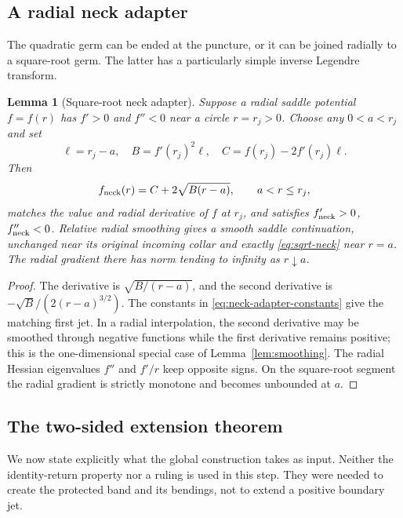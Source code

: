 \documentclass[11pt]{amsart}
\newtheorem{lemma}[theorem]{Lemma}
\theoremstyle{definition}
\theoremstyle{remark}
\numberwithin{equation}{section}
\begin{document}
\subsection{A radial neck adapter}
The quadratic germ can be ended at the puncture, or it can be joined
radially to a square-root germ. The latter has a particularly simple
inverse Legendre transform.

\begin{lemma}[Square-root neck adapter]\label{lem:neck-adapter}
Suppose a radial saddle potential $f=f(r)$ has $f'>0$ and $f''<0$
near a circle $r=r_j>0$. Choose any $0<a<r_j$ and set
\begin{equation}\label{eq:neck-adapter-constants}
 \ell=r_j-a,\quad B=f'(r_j)^2\ell,\quad
 C=f(r_j)-2f'(r_j)\ell.
\end{equation}
Then
\begin{equation}\label{eq:sqrt-neck}
 f_{\rm neck}(r)=C+2\sqrt{B(r-a)},\qquad a<r\le r_j,
\end{equation}
matches the value and radial derivative of $f$ at $r_j$, and satisfies
$f_{\rm neck}'>0$, $f_{\rm neck}''<0$. Relative radial smoothing gives
a smooth saddle continuation, unchanged near its original incoming
collar and exactly \eqref{eq:sqrt-neck} near $r=a$. The radial gradient
there has norm tending to infinity as $r\downarrow a$.
\end{lemma}
\begin{proof}
The derivative is $\sqrt{B/(r-a)}$, and the second derivative is
$-\sqrt B/(2(r-a)^{3/2})$. The constants in
\eqref{eq:neck-adapter-constants} give the matching first jet. In a
radial interpolation, the second derivative may be smoothed through
negative functions while the first derivative remains positive; this
is the one-dimensional special case of Lemma~\ref{lem:smoothing}.
The radial Hessian eigenvalues $f''$ and $f'/r$ keep opposite signs.
On the square-root segment the radial gradient is strictly monotone
and becomes unbounded at $a$.
\end{proof}

\subsection{The two-sided extension theorem}
We now state explicitly what the global construction takes as input.
Neither the identity-return property nor a ruling is used in this
step. They were needed to create the protected band and its bendings,
not to extend a positive boundary jet.
\end{document}
